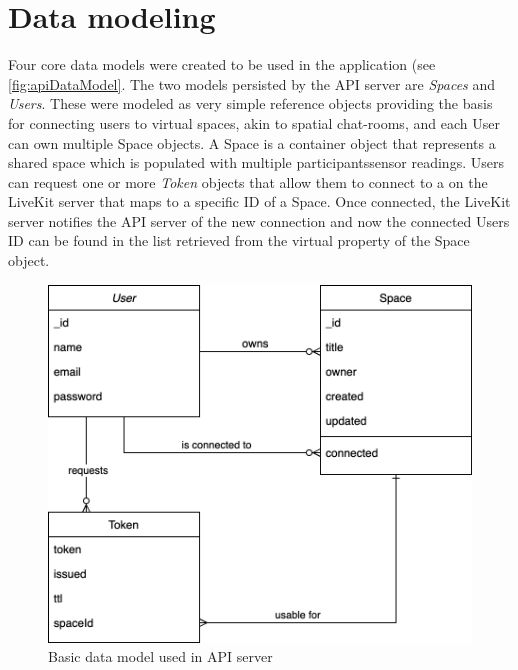 \section{Data modeling}
\label{sec:datamodeling}

Four core data models were created to be used in the application (see \autoref{fig:apiDataModel}.
The two models persisted by the \ac{API} server are \emph{Spaces} and \emph{Users}.
These were modeled as very simple reference objects providing the basis for connecting users to virtual spaces, akin to spatial chat-rooms, and each User can own multiple Space objects.
A Space is a container object that represents a shared space which is populated with multiple participants\textquotesingle sensor readings.
Users can request one or more \emph{Token} objects that allow them to connect to a  on the LiveKit server that maps to a specific ID of a Space.
Once connected, the LiveKit server notifies the \ac{API} server of the new connection and now the connected User\textquotesingle s ID can be found in the list retrieved from the virtual  property of the Space object.

\begin{figure}[h]
\centering
\includegraphics[scale=0.4]{04_Artefakte/01_Abbildungen/api-datamodel}
\caption[API data model]{Basic data model used in API server\protect}
\label{fig:apiDataModel}
\end{figure}

